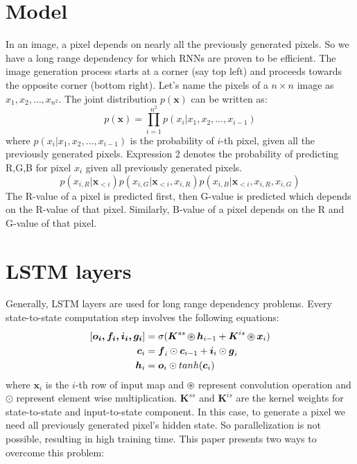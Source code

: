 \documentclass{article}
\newcommand{\circlesign}[1]{
    \mathbin{
        \mathchoice
        {\buildcirclesign{\displaystyle}{#1}}
        {\buildcirclesign{\textstyle}{#1}}
        {\buildcirclesign{\scriptstyle}{#1}}
        {\buildcirclesign{\scriptscriptstyle}{#1}}
    }
}
\newcommand\buildcirclesign[2]{%
    \begin{tikzpicture}[baseline=(X.base), inner sep=0, outer sep=0]
    \node[draw,circle] (X)  {\ensuremath{#1 #2}};
    \end{tikzpicture}%
}
\begin{document}
\section*{Model}
In an image, a pixel depends on nearly all the previously generated pixels. So we have a long range dependency for which RNNs are proven to be efficient. The image generation process starts at a corner (say top left) and proceeds towards the opposite corner (bottom right). Let's name the pixels of a $n \times n$ image as $x_1, x_2, \dots,x_{n^2}$. The joint distribution $p(\textbf{x})$ can be written as:
\begin{equation}
    {\displaystyle p(\textbf{x}) = \prod_{i=1}^{n^2} p(x_i | x_1, x_2, \dots,x_{i-1})}
\end{equation}
where $p(x_i | x_1, x_2, \dots,x_{i-1})$ is the probability of $i$-th pixel, given all the previously generated pixels.
Expression 2 denotes the probability of predicting R,G,B for pixel $x_i$ given all previously generated pixels.
\begin{equation}
    {\displaystyle p(x_{i,R} | \textbf{x}_{<i}) p(x_{i,G} | \textbf{x}_{<i}, x_{i,R}) p(x_{i,B} | \textbf{x}_{<i}, x_{i,R}, x_{i,G})}
\end{equation}
 The R-value of a pixel is predicted first, then G-value is predicted which depends on the R-value of that pixel. Similarly, B-value of a pixel depends on the R and G-value of that pixel.

\section*{LSTM layers}
Generally, LSTM layers are used for long range dependency problems. Every state-to-state computation step involves the following equations:
\begin{equation}
    \begin{split}
        [\boldsymbol{o_i, f_i, i_i, g_i}] & = \sigma(\boldsymbol{K}^{ss}\circlesign{*}\boldsymbol{h}_{i-1} + \boldsymbol{K}^{is}\circlesign{*}\boldsymbol{x}_i)\\
        \boldsymbol{c}_i & = \boldsymbol{f}_i \odot \boldsymbol{c}_{i-1} + \boldsymbol{i}_i\odot \boldsymbol{g}_i\\
        \boldsymbol{h}_i & = \boldsymbol{o}_i \odot tanh(\boldsymbol{c}_i)
    \end{split}
\end{equation}
where $\boldsymbol{x}_i$ is the $i$-th row of input map and $\circlesign{*}$ represent convolution operation and $\odot$ represent element wise multiplication. $\boldsymbol{K}^{ss}$ and $\boldsymbol{K}^{is}$ are the kernel weights for state-to-state and input-to-state component.
In this case, to generate a pixel we need all previously generated pixel's hidden state. So parallelization is not possible, resulting in high training time. This paper presents two ways to overcome this problem:
\end{document}
